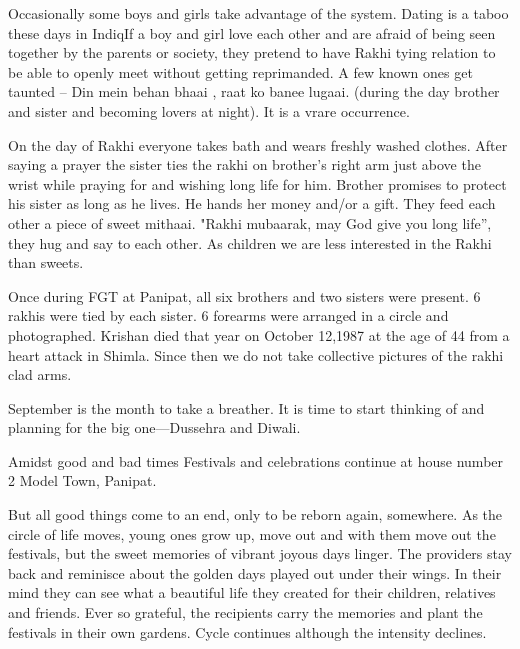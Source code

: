 Occasionally some boys and girls take advantage of the system. Dating is
a taboo these days in IndiqIf a boy and girl love each other and are
afraid of being seen together by the parents or society, they pretend to
have Rakhi tying relation to be able to openly meet without getting
reprimanded. A few known ones get taunted -- Din mein behan bhaai , raat
ko banee lugaai. (during the day brother and sister and becoming lovers at
night). It is a vrare occurrence. 

On the day of Rakhi  everyone takes bath and wears freshly washed clothes.
After saying a prayer the sister ties the rakhi on brother's right arm
just above the wrist while praying for and wishing long life for him.
Brother promises to protect his sister as long as he lives. He hands her
money and/or a gift. They feed each other a piece of sweet mithaai. "Rakhi
mubaarak, may God give you long life”, they hug and say to each other. As
children we are less interested in the Rakhi than sweets. 

Once during FGT at Panipat, all six brothers and two sisters were present.
6 rakhis were tied by each sister. 6 forearms were arranged in a circle
and photographed. Krishan died that year on October 12,1987 at the age of
44 from a heart attack in Shimla. Since then we do not take collective
pictures of the rakhi clad arms. 

September is the month to take a breather. It is time to start thinking of
and planning for the big one—Dussehra and Diwali. 

Amidst good and bad times Festivals and celebrations continue at house
number 2 Model Town, Panipat. 

But all good things come to an end, only to be reborn again, somewhere. As
the circle of life moves, young ones grow up, move out and with them move
out the festivals, but the sweet memories of vibrant joyous days linger.
The providers stay back and reminisce about the golden days played out
under their wings. In their mind they can see what a beautiful life they
created for their children, relatives and friends. Ever so grateful, the
recipients carry the memories and plant the festivals in their own
gardens. Cycle continues although the intensity declines. 
